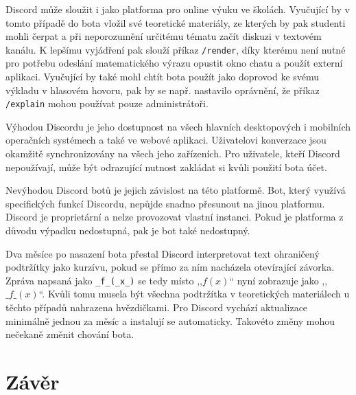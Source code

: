 \documentclass[FM]{tulthesis}
\begin{document}
	Discord může sloužit i jako platforma pro online výuku ve školách. Vyučující by v tomto případě do bota vložil své teoretické materiály, ze kterých by pak studenti mohli čerpat a při neporozumění určitému tématu začít diskuzi v textovém kanálu. K lepšímu vyjádření pak slouží příkaz \verb|/render|, díky kterému není nutné pro potřebu odeslání matematického výrazu opustit okno chatu a použít externí aplikaci. Vyučující by také mohl chtít bota použít jako doprovod ke svému výkladu v hlasovém hovoru, pak by se např. nastavilo oprávnění, že příkaz \verb|/explain| mohou používat pouze administrátoři.
	
	Výhodou Discordu je jeho dostupnost na všech hlavních desktopových i mobilních operačních systémech a také ve webové aplikaci. Uživatelovi konverzace jsou okamžitě synchronizovány na všech jeho zařízeních. Pro uživatele, kteří Discord nepoužívají, může být odrazující nutnost zakládat si kvůli použití bota účet.
	
	Nevýhodou Discord botů je jejich závislost na této platformě. Bot, který využívá specifických funkcí Discordu, nepůjde snadno přesunout na jinou platformu. Discord je proprietární a nelze provozovat vlastní instanci. Pokud je platforma z důvodu výpadku nedostupná, pak je bot také nedostupný.
	
	Dva měsíce po nasazení bota přestal Discord interpretovat text ohraničený podtržítky jako kurzívu, pokud se přímo za ním nacházela otevírající závorka. Zpráva napsaná jako \verb|_f_(_x_)| se tedy místo ,,$f(x)$`` nyní zobrazuje jako ,,$\_f\_(x)$``. Kvůli tomu musela být všechna podtržítka v teoretických materiálech u těchto případů nahrazena hvězdičkami. Pro Discord vychází aktualizace minimálně jednou za měsíc a instalují se automaticky. Takovéto změny mohou nečekaně změnit chování bota.

	
	\chapter{Závěr}
	
	
	
\end{document}
